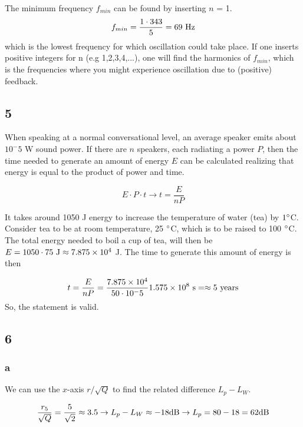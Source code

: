 \documentclass{article}
\begin{document}
The minimum frequency $f_{min}$ can be found by inserting $n$ = 1. $$f_{min}= \frac{1 \cdot 343}{5} = 69\ {\rm Hz}$$ 
which is the lowest frequency for which oscillation could take place. If one inserts positive integers for n (e.g 1,2,3,4,...), one will find the harmonics of $f_{min}$, which is the frequencies where you might experience oscillation due to (positive) feedback.

\subsection*{5}

When speaking at a normal conversational level, an average speaker emits about $10^-5$ W sound power. If there are $n$ speakers, each radiating a power $P$, then the time needed to generate an amount of energy $E$ can be calculated realizing that energy is equal to the product of power and time.

\begin{equation}
    E \cdot P \cdot t \rightarrow t=\frac{E}{nP}
\end{equation}

It takes around 1050 J energy to increase the temperature of water (tea) by $1\degree$C. Consider tea to be at room temperature, 25 $\degree$C, which is to be raised to 100 $\degree$C. The total energy  needed to boil a cup of tea, will then be $E = 1050 \cdot 75 \ {\rm J} \approx 7.875 \times 10^4$ J. The time to generate this amount of energy is then

\begin{equation}
    t =  \frac{E}{nP} = \frac{7.875 \times 10^4}{50 \cdot 10^-5}1.575 \times 10^8 \ {\rm s} = \approx 5  \ {\rm years}
\end{equation}
So, the statement is valid.

\subsection*{6}

\subsubsection*{a}

We can use the $x$-axis $r/\sqrt{Q}$ to find the related difference $L_p-L_W$.

\begin{equation}
    \frac{r_5}{\sqrt{Q}}= \frac{5}{\sqrt{2}} \approx 3.5 \rightarrow L_p - L_W \approx -18 {\rm dB} \rightarrow L_p = 80 - 18 = 62 {\rm dB}
\end{equation}
\end{document}
